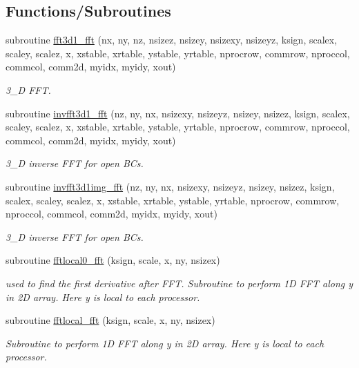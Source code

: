 \subsection*{Functions/\+Subroutines}
\begin{DoxyCompactItemize}
\item 
subroutine \mbox{\hyperlink{namespacefftclass_acef38aed3ece8d2c1120ce0004e6297e}{fft3d1\+\_\+fft}} (nx, ny, nz, nsizez, nsizey, nsizexy, nsizeyz, ksign, scalex, scaley, scalez, x, xstable, xrtable, ystable, yrtable, nprocrow, commrow, nproccol, commcol, comm2d, myidx, myidy, xout)
\begin{DoxyCompactList}\small\item\em 3\+\_\+D F\+FT. \end{DoxyCompactList}\item 
subroutine \mbox{\hyperlink{namespacefftclass_a21e8a7bd2877ec439bc4f0e0bc0e4681}{invfft3d1\+\_\+fft}} (nz, ny, nx, nsizexy, nsizeyz, nsizey, nsizez, ksign, scalex, scaley, scalez, x, xstable, xrtable, ystable, yrtable, nprocrow, commrow, nproccol, commcol, comm2d, myidx, myidy, xout)
\begin{DoxyCompactList}\small\item\em 3\+\_\+D inverse F\+FT for open B\+Cs. \end{DoxyCompactList}\item 
subroutine \mbox{\hyperlink{namespacefftclass_a374c599138aeca237d4c303a07a470ee}{invfft3d1img\+\_\+fft}} (nz, ny, nx, nsizexy, nsizeyz, nsizey, nsizez, ksign, scalex, scaley, scalez, x, xstable, xrtable, ystable, yrtable, nprocrow, commrow, nproccol, commcol, comm2d, myidx, myidy, xout)
\begin{DoxyCompactList}\small\item\em 3\+\_\+D inverse F\+FT for open B\+Cs. \end{DoxyCompactList}\item 
subroutine \mbox{\hyperlink{namespacefftclass_a501325267c1425bfece04a18e20efe31}{fftlocal0\+\_\+fft}} (ksign, scale, x, ny, nsizex)
\begin{DoxyCompactList}\small\item\em used to find the first derivative after F\+FT. Subroutine to perform 1D F\+FT along y in 2D array. Here y is local to each processor. \end{DoxyCompactList}\item 
subroutine \mbox{\hyperlink{namespacefftclass_aa64d94b8c8578b384955207a409a2445}{fftlocal\+\_\+fft}} (ksign, scale, x, ny, nsizex)
\begin{DoxyCompactList}\small\item\em Subroutine to perform 1D F\+FT along y in 2D array. Here y is local to each processor. \end{DoxyCompactList}\item 

\end{DoxyCompactItemize}
